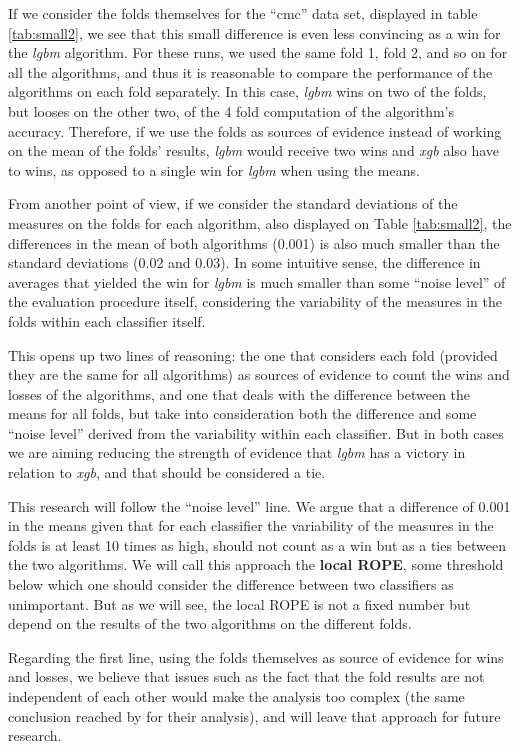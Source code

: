 \documentclass[twoside,11pt,preprint]{article}
\begin{document}
If we consider the folds themselves for the ``cmc'' data set, displayed
in table \ref{tab:small2}, we see that this small difference is
even less convincing as a win for the \emph{lgbm} algorithm. For these
runs, we used the same fold 1, fold 2, and so on for all the
algorithms, and thus it is reasonable to compare the performance of
the algorithms on each fold separately. In this case, \emph{lgbm} wins on
two of the folds, but looses on the other two, of the 4 fold
computation of the algorithm's accuracy. Therefore, if we use the
folds as sources of evidence instead of working on the mean of the
folds' results, \emph{lgbm} would receive two wins and \emph{xgb} also have to
wins, as opposed to a single win for \emph{lgbm} when using the means.

From another point of view, if we consider the standard deviations of
the measures on the folds for each algorithm, also displayed on Table
\ref{tab:small2}, the differences in the mean of both algorithms
(0.001) is also much smaller than the standard deviations (0.02 and
0.03). In some intuitive sense, the difference in averages that
yielded the win for \emph{lgbm} is much smaller than some ``noise level'' of
the evaluation procedure itself, considering the variability of the
measures in the folds within each classifier itself.

This opens up two lines of reasoning: the one that considers each fold
(provided they are the same for all algorithms) as sources of evidence
to count the wins and losses of the algorithms, and one that deals
with the difference between the means for all folds, but take into
consideration both the difference and some ``noise level'' derived from
the variability within each classifier. But in both cases we are
aiming reducing the strength of evidence that \emph{lgbm} has a victory in
relation to \emph{xgb}, and that should be considered a tie.

This research will follow the ``noise level'' line. We argue that a
difference of 0.001 in the means given that for each classifier the
variability of the measures in the folds is at least 10 times as high,
should not count as a win but as a ties between the two algorithms.
We will call this approach the \textbf{local ROPE}, some threshold below
which one should consider the difference between two classifiers as
unimportant. But as we will see, the local ROPE is not a fixed number but
depend on the results of the two algorithms on the different folds.

Regarding the first line, using the folds themselves as source of
evidence for wins and losses, we believe that issues such as the fact
that the fold results are not independent of each other would make the
analysis too complex (the same conclusion reached by \citet{benavoli2017time}
for their analysis), and will leave that approach for future research.
\end{document}

